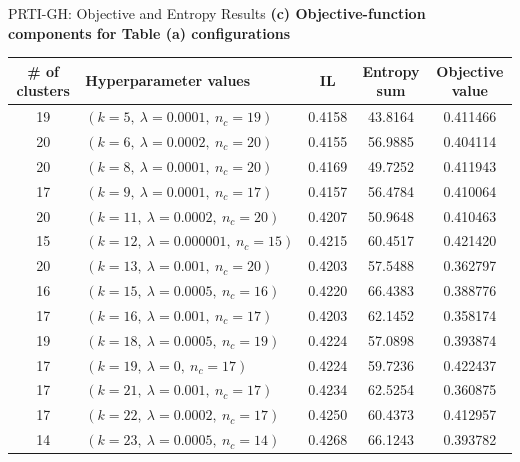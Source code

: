 \documentclass[9pt]{beamer}
\begin{document}
\begin{frame}[t]{PRTI-GH: Objective and Entropy Results}
    \scriptsize
    \centering
    \textbf{(c) Objective-function components for Table (a) configurations}

    \vspace{0.12cm}
    \renewcommand{\arraystretch}{0.98}
    \setlength{\tabcolsep}{2.4pt}

    {\tiny
    \begin{tabular*}{\textwidth}{@{}@{\extracolsep{\fill}}clccc@{}}
        \toprule
        \textbf{\# of clusters} & \textbf{Hyperparameter values} & \textbf{IL} &
        \textbf{Entropy sum} & \textbf{Objective value} \\
        \midrule
        19 & $(k=5,\ \lambda=0.0001,\ n_c=19)$             & 0.4158 & 43.8164  &  0.411466 \\
        20 & $(k=6,\ \lambda=0.0002,\ n_c=20)$             & 0.4155 & 56.9885  &  0.404114 \\
        20 & $(k=8,\ \lambda=0.0001,\ n_c=20)$             & 0.4169 & 49.7252  &  0.411943 \\
        17 & $(k=9,\ \lambda=0.0001,\ n_c=17)$             & 0.4157 & 56.4784  &  0.410064 \\
        20 & $(k=11,\ \lambda=0.0002,\ n_c=20)$            & 0.4207 & 50.9648  &  0.410463 \\
        15 & $(k=12,\ \lambda=0.000001,\ n_c=15)$          & 0.4215 & 60.4517  &  0.421420 \\
        20 & $(k=13,\ \lambda=0.001,\ n_c=20)$             & 0.4203 & 57.5488  &  0.362797 \\
        16 & $(k=15,\ \lambda=0.0005,\ n_c=16)$            & 0.4220 & 66.4383  &  0.388776 \\
        17 & $(k=16,\ \lambda=0.001,\ n_c=17)$             & 0.4203 & 62.1452  &  0.358174 \\
        19 & $(k=18,\ \lambda=0.0005,\ n_c=19)$            & 0.4224 & 57.0898  &  0.393874 \\
        17 & $(k=19,\ \lambda=0,\ n_c=17)$                 & 0.4224 & 59.7236  &  0.422437 \\
        17 & $(k=21,\ \lambda=0.001,\ n_c=17)$             & 0.4234 & 62.5254  &  0.360875 \\
        17 & $(k=22,\ \lambda=0.0002,\ n_c=17)$            & 0.4250 & 60.4373  &  0.412957 \\
        14 & $(k=23,\ \lambda=0.0005,\ n_c=14)$            & 0.4268 & 66.1243  &  0.393782 \\

\end{tabular*}}
\end{frame}
\end{document}

